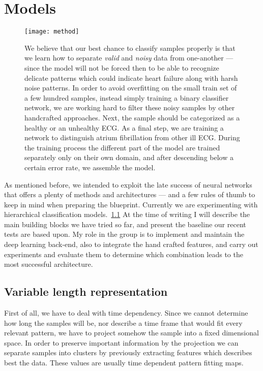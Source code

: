 \chapter{Models}
\begin{figure}[h]
  \centering
  \texttt{[image: method]}\label{fig:method}
  \caption{We believe that our best chance to classify samples properly is that we learn how to separate \textit{valid} and \textit{noisy} data from one-another --- since the model will not be forced then to be able to recognize delicate patterns which could indicate heart failure along with harsh noise patterns. In order to avoid overfitting on the small train set of a few hundred samples, instead simply training a binary classifier network, we are working hard to filter these noisy samples by other handcrafted approaches. Next, the sample should be categorized as a healthy or an unhealthy ECG. As a final step, we are training a network to distinguish atrium fibrillation from other ill ECG. During the training process the different part of the model are trained separately only on their own domain, and after descending below a certain error rate, we assemble the model.}
\end{figure}

As mentioned before, we intended to exploit the late success of neural networks that offers a plenty of methods and architectures --- and a few rules of thumb to keep in mind when preparing the blueprint.
Currently we are experimenting with hierarchical classification models.~\ref{fig:method}
At the time of writing I will describe the main building blocks we have tried so far, and present the baseline our recent tests are based upon.
My role in the group is to implement and maintain the deep learning back-end, also to integrate the hand crafted features, and carry out experiments and evaluate them to determine which combination leads to the most successful architecture.

\section{Variable length representation}
First of all, we have to deal with time dependency. Since we cannot determine how long the samples will be, nor describe a time frame that would fit every relevant pattern, we have to project somehow the sample into a fixed dimensional space. In order to preserve important information by the projection we can separate samples into clusters by previously extracting features which describes best the data. These values are usually time dependent pattern fitting maps.

